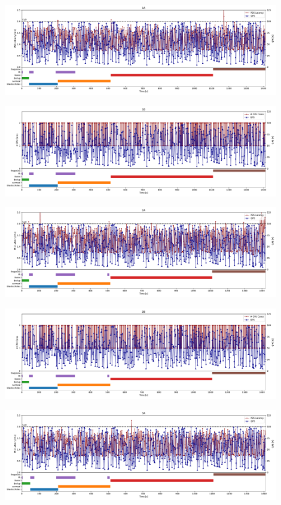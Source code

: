 \documentclass[11pt]{article}
\begin{document}
\begin{enumerate}
    \begin{center}
    {\includegraphics[width=0.9\textwidth]{plot2/1A.pdf}}
    \end{center}
    \begin{center}
    {\includegraphics[width=0.9\textwidth]{plot2/1B.pdf}}
    \end{center}
    \begin{center}
    {\includegraphics[width=0.9\textwidth]{plot2/2A.pdf}}
    \end{center}
    \begin{center}
    {\includegraphics[width=0.9\textwidth]{plot2/2B.pdf}}
    \end{center}
    \begin{center}
    {\includegraphics[width=0.9\textwidth]{plot2/3A.pdf}}

\end{center}
\end{enumerate}
\end{document}
